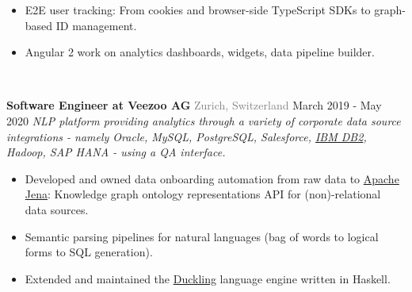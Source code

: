 \documentclass{article}
\begin{document}
\begin{flushleft}
\begin{itemize}[label=\raisebox{0.25ex}{\tiny$\bullet$}, leftmargin=1.5em, labelsep=0.3em]
            \item E2E user tracking: From cookies and browser-side TypeScript SDKs to graph-based ID management.
                \item Angular 2 work on analytics dashboards, widgets, data pipeline builder.
            \end{itemize}
                             \\ [1ex] 
        \end{flushleft}

        \begin{flushleft}
        \textbf{\large Software Engineer at Veezoo AG} {\footnotesize \textcolor{gray}{Zurich, Switzerland}} \hfill \small March 2019 - May 2020   
            \newline
        \textit{NLP platform providing analytics through a variety of corporate data source integrations - namely Oracle, MySQL, PostgreSQL, Salesforce, \href{https://www.ibm.com/products/db2}{IBM DB2}, Hadoop, SAP HANA - using a QA interface.}
            \begin{itemize}[label=\raisebox{0.25ex}{\tiny$\bullet$}, leftmargin=1.5em, labelsep=0.3em]
                \item Developed and owned data onboarding automation from raw data to \href{https://github.com/apache/jena}{Apache Jena}: Knowledge graph ontology representations API for (non)-relational data sources. 
                \item Semantic parsing pipelines for natural languages (bag of words to logical forms to SQL generation).
                \item Extended and maintained the \href{https://github.com/facebook/duckling}{Duckling} language engine written in Haskell.
            \end{itemize}
               \\ [1ex] 
        \end{flushleft}
\end{document}
